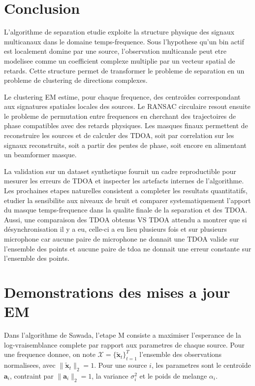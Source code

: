 \documentclass[11pt,a4paper]{article}
\begin{document}
\section{Conclusion}

L'algorithme de separation etudie exploite la structure physique des signaux
multicanaux dans le domaine temps-frequence. Sous l'hypothese qu'un bin actif
est localement domine par une source, l'observation multicanale peut etre
modelisee comme un coefficient complexe multiplie par un vecteur spatial de
retards. Cette structure permet de transformer le probleme de separation en un
probleme de clustering de directions complexes.

Le clustering EM estime, pour chaque frequence, des centroïdes correspondant
aux signatures spatiales locales des sources. Le RANSAC circulaire resout
ensuite le probleme de permutation entre frequences en cherchant des
trajectoires de phase compatibles avec des retards physiques. Les masques finaux
permettent de reconstruire les sources et de calculer des TDOA, soit par
correlation sur les signaux reconstruits, soit a partir des pentes de phase, soit
encore en alimentant un beamformer masque.

La validation sur un dataset synthetique fournit un cadre reproductible pour
mesurer les erreurs de TDOA et inspecter les artefacts internes de l'algorithme.
Les prochaines etapes naturelles consistent a completer les resultats
quantitatifs, etudier la sensibilite aux niveaux de bruit et comparer
systematiquement l'apport du masque temps-frequence dans la qualite finale de la
separation et des TDOA. Aussi, une comparaison des TDOA obtenus VS TDOA attendu a montrer que si désynchronisation
il y a eu, celle-ci a eu lieu plusieurs fois et sur plusieurs microphone car aucune paire de microphone ne donnait 
une TDOA valide sur l'ensemble des points et aucune paire de tdoa ne donnait une erreur constante sur l'ensemble 
des points. 

\appendix

\section{Demonstrations des mises a jour EM}
\label{annexe:em-mstep}

Dans l'algorithme de Sawada, l'etape M consiste a maximiser l'esperance de la
log-vraisemblance complete par rapport aux parametres de chaque source. Pour une
frequence donnee, on note
$\mathcal{X}=\{\tilde{\mathbf{x}}_t\}_{t=1}^{T}$ l'ensemble des observations
normalisees, avec $\|\tilde{\mathbf{x}}_t\|_2=1$. Pour une source $i$, les
parametres sont le centroïde $\mathbf{a}_i$, contraint par
$\|\mathbf{a}_i\|_2=1$, la variance $\sigma_i^2$ et le poids de melange
$\alpha_i$.
\end{document}

